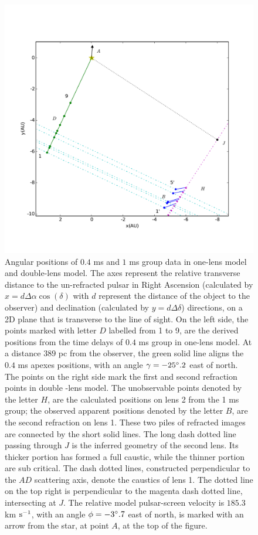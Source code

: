 \documentclass[useAMS,usenatbib]{mn2e}
\begin{document}
\begin{figure}
\centering
\includegraphics[width=7.5in]{Double_lens_xy.pdf}
\caption{Angular positions of $0.4$ ms and $1$ ms group data in one-lens model and double-lens model.  
The axes represent the relative transverse distance to the un-refracted pulsar in Right Ascension (calculated by $x= d\Delta \alpha \cos(\delta)$ with $d$ represent the distance of the object to the observer) and declination (calculated by $y=d\Delta \delta $) directions, on a 2D plane that is transverse to the line of sight. %
On the left side, the points marked with letter $D$ labelled from 1 to 9, are the derived
positions from the time delays of $0.4$ ms group in 
one-lens
model. At a distance $389$ pc from the observer, the green solid line aligns the
$0.4$ ms apexes positions, with an angle $\gamma=-25\degree.2$ east of
north. The points on the right side mark the first and second
refraction points in double -lens model.  
The unobservable points
denoted by the letter $H$, are the calculated positions on lens 2 from the
1
 ms group; the observed apparent positions denoted by the letter $B$, are the  
second refraction on lens 1.  
These two piles of
refracted images are connected by the short solid lines. The long
dash dotted line passing through $J$ is the inferred geometry of the second
lens.  Its thicker portion has formed a full caustic, while the
thinner portion are sub critical.
The dash 
dotted lines, constructed perpendicular to the $AD$ scattering axis,
denote the caustics of lens 1. The dotted line on the top right is
perpendicular to the magenta dash dotted line, intersecting at $J$.   
The relative model pulsar-screen velocity is $185.3$ km $\rm s^{-1}$, with an angle $\phi=-3\degree.7$ east of north, is marked with an arrow from the star, at point $A$, at the top of the figure.} 
\label{Doublelens}
\end{figure}
\end{document}
